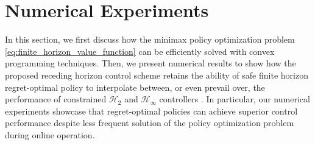 \documentclass[conference]{IEEEtran}
\begin{document}
\section{Numerical Experiments}
\label{sec:numerical}
In this section, we first discuss how the minimax policy optimization problem \eqref{eq:finite_horizon_value_function} can be efficiently solved with convex programming techniques. Then, we present numerical results to show how the proposed receding horizon control scheme retains the ability of safe finite horizon regret-optimal policy to interpolate between, or even prevail over, the performance of constrained $\mathcal{H}_2$ and $\mathcal{H}_\infty$ controllers \cite{martin2022safe, didier2022system}. In particular, our numerical experiments showcase that regret-optimal policies can achieve superior control performance despite less frequent solution of the policy optimization problem during online operation.
\end{document}
